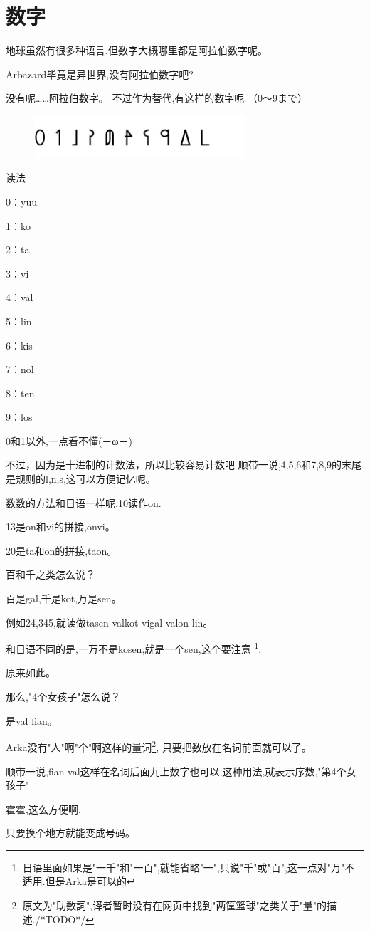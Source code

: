 \chapter{数字}
地球虽然有很多种语言,但数字大概哪里都是阿拉伯数字呢。

Arbazard毕竟是异世界,没有阿拉伯数字吧?


没有呢……阿拉伯数字。
不过作为替代,有这样的数字呢
（0～9まで）
\begin{figure}[H]
\includegraphics[width=0.7\textwidth]{ARKA/alx.jpg}
\end{figure}

\FiveStar 读法

0：yuu

1：ko 

2：ta 

3：vi 

4：val 

5：lin 

6：kis 

7：nol 

8：ten 

9：los 

0和1以外,一点看不懂(－ω－)


不过，因为是十进制的计数法，所以比较容易计数吧
顺带一说,4,5,6和7,8,9的末尾是规则的l,n,s,这可以方便记忆呢。



数数的方法和日语一样呢.10读作on.

13是on和vi的拼接,onvi。

20是ta和on的拼接,taon。


百和千之类怎么说？


百是gal,千是kot,万是sen。

例如24,345,就读做tasen valkot vigal valon lin。


和日语不同的是,一万不是kosen,就是一个sen,这个要注意
\footnote{日语里面如果是"一千"和"一百",就能省略"一",只说"千"或"百",这一点对"万"不适用.但是Arka是可以的}.


原来如此。

那么,"4个女孩子"怎么说？


是val fian。

Arka没有"人"啊"个"啊这样的量词\footnote{原文为"助数詞",译者暂时没有在网页中找到"两筐篮球"之类关于"量"的描述./*TODO*/},
只要把数放在名词前面就可以了。

顺带一说,fian val这样在名词后面九上数字也可以,这种用法,就表示序数,"第4个女孩子"


霍霍,这么方便啊.

只要换个地方就能变成号码。